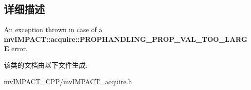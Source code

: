 \subsection{详细描述}
An exception thrown in case of a {\bfseries mv\+I\+M\+P\+A\+C\+T\+::acquire\+::\+P\+R\+O\+P\+H\+A\+N\+D\+L\+I\+N\+G\+\_\+\+P\+R\+O\+P\+\_\+\+V\+A\+L\+\_\+\+T\+O\+O\+\_\+\+L\+A\+R\+G\+E} error. 

该类的文档由以下文件生成\+:\begin{DoxyCompactItemize}
\item 
mv\+I\+M\+P\+A\+C\+T\+\_\+\+C\+P\+P/mv\+I\+M\+P\+A\+C\+T\+\_\+acquire.\+h\end{DoxyCompactItemize}
